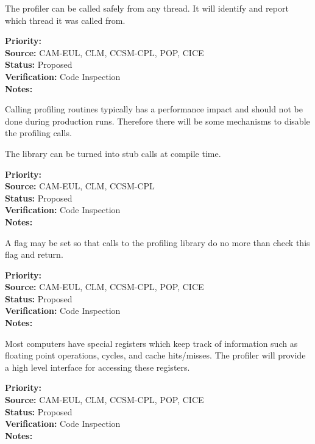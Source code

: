 The profiler can be called safely from any thread.  It will 
identify and report which thread it was called from.

\begin{reqlist}
{\bf Priority:}  \\
{\bf Source:} CAM-EUL, CLM, CCSM-CPL, POP, CICE \\
{\bf Status:} Proposed \\
{\bf Verification:} Code Inspection \\
{\bf Notes:} 
\end{reqlist}


Calling profiling routines typically has a performance impact and should not
be done during production runs.  Therefore there will be some mechanisms to 
disable the profiling calls.


The library can be turned into stub calls at compile time.

\begin{reqlist}
{\bf Priority:}  \\
{\bf Source:} CAM-EUL, CLM, CCSM-CPL \\
{\bf Status:} Proposed \\
{\bf Verification:} Code Inspection \\
{\bf Notes:} 
\end{reqlist}


A flag may be set so that calls to the profiling library do no more than check
this flag and return.

\begin{reqlist}
{\bf Priority:}  \\
{\bf Source:} CAM-EUL, CLM, CCSM-CPL, POP, CICE \\
{\bf Status:} Proposed \\
{\bf Verification:} Code Inspection \\
{\bf Notes:} 
\end{reqlist}


Most computers have special registers which keep track of information such
as floating point operations, cycles, and cache hits/misses.  The profiler will
provide a high level interface for accessing these registers.

\begin{reqlist}
{\bf Priority:}  \\
{\bf Source:} CAM-EUL, CLM, CCSM-CPL, POP, CICE \\
{\bf Status:} Proposed \\
{\bf Verification:} Code Inspection \\
{\bf Notes:} 
\end{reqlist}
